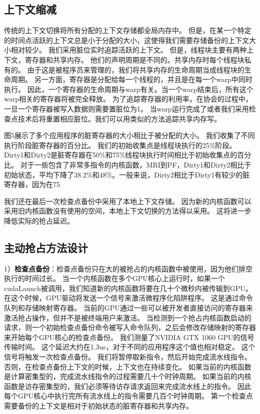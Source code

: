 \subsection{上下文缩减}
传统的上下文切换将所有分配的上下文存储都全局内存中。
但是，在某一个特定的时间点活跃的上下文总是小于分配的大小，这使得我们需要存储备份的上下文大小相对较少。
我们采用脏位实时追踪活跃的上下文。
但是，线程块主要有两种上下文，寄存器和共享内存。
他们的声明周期是不同的。共享内存时每个线程块私有的。
由于这是被程序员来管理的，我们将共享内存的生命周期当成线程块的生命周期。
另一方面，寄存器是分配给每一个线程的，并且是在每一个warp中同时执行。
因此，一个寄存器的生命周期与warp有关。当一个warp结束后，所有这个warp相关的寄存器将被完全释放。
为了追踪寄存器的利用率，在协会的过程中，一旦一个寄存器被写入数据则需要置脏位为1。
当warp运行完成了或者我们采用检查点技术后将重置相应脏位。我们可以用类似的方法追踪共享内存写。

图5展示了多个应用程序的脏寄存器的大小相比于被分配的大小。
我们收集了不同执行阶段脏寄存器的百分比。
我们的初始收集点是线程块执行的25\%阶段。
Dirty1和Dirty2是脏寄存器在50\%和75\%线程块执行时间相比于初始收集点的百分比。
对于一些包含了非常多指令的内核函数，MRI到PF，Dirty1和Dirty2相比于初始状态，平均下降了38.2\%和48\%。一般来说，Dirty2相比于Dirty1有较少的脏寄存器，因为在75%

我们还在最后一次检查点备份中采用了本地上下文存储。
因为新的内核函数可以采用旧内核函数没有使用的空间，本地上下文切换的方法得以采用。
这将进一步降低实际的抢占延迟。

\subsection{主动抢占方法设计}

1）\textbf{检查点备份}：检查点备份只在大的被抢占的内核函数中被使用，因为他们排空执行的时间过长。
当一个内核函数在多个GPU核心上运行时，如果一个cudaLaunch被调用，我们知道新的内核函数将要在几十个微秒内被传输到GPU。
在这个时候，GPU驱动将发送一个信号来激活微程序化陷阱程序。
这是通过命令队列和存储映射寄存器。
当前的GPU通过一些可以被开发者直接访问的寄存器来激活抢占操作，但并不是被终端用户来激活。
当检测到一个抢占内核函数启动的请求，则一个初始检查点备份命令被写入命令队列，之后会修改存储映射的寄存器来开始每个GPU核心的检查点备份。
我们测量了NVIDIA GTX 1060 GPU的信号传输时间。
这个延迟大约在1.3us，对于不同的应用程序这个值也相对稳定。
这个信号将触发一次检查点备份。
我们将暂停取新指令，然后开始完成流水线指令。
否则，在检查点备份上下文的时候，上下文也在持续变化。
如果当前的内核函数是计算密集型的，完成流水线指令的过程需要几十个时钟周期。
如果当前的内核函数是访存密集型的，我们必须等待访存请求返回来完成流水线上的指令。
因此每个GPU核心中执行完所有流水线上的指令需要几百个时钟周期。
第一个检查点需要备份的上下文是相对于初始状态的脏寄存器和共享内存。

